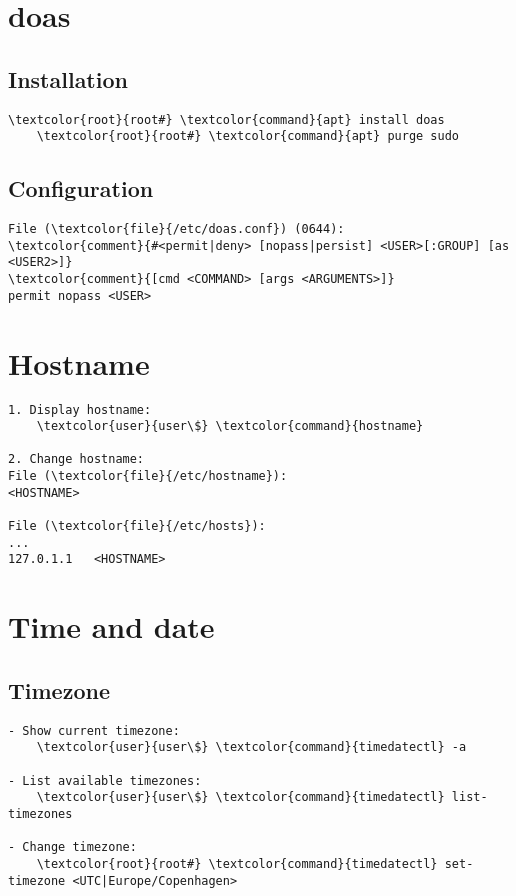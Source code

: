 \documentclass[10pt, a4paper, onecolumn, openany]{book} %
\begin{document}
\section{doas}
\subsection{Installation}
\begin{Verbatim}[commandchars=\\\{\}]
    \textcolor{root}{root#} \textcolor{command}{apt} install doas
    \textcolor{root}{root#} \textcolor{command}{apt} purge sudo
\end{Verbatim}
\subsection{Configuration}
\begin{Verbatim}[commandchars=\\\{\}]
File (\textcolor{file}{/etc/doas.conf}) (0644):
\textcolor{comment}{#<permit|deny> [nopass|persist] <USER>[:GROUP] [as <USER2>]}
\textcolor{comment}{[cmd <COMMAND> [args <ARGUMENTS>]}
permit nopass <USER>
\end{Verbatim}

\section{Hostname}
\begin{Verbatim}[commandchars=\\\{\}]
1. Display hostname:
    \textcolor{user}{user\$} \textcolor{command}{hostname}
    
2. Change hostname:
File (\textcolor{file}{/etc/hostname}):
<HOSTNAME>

File (\textcolor{file}{/etc/hosts}):
...
127.0.1.1   <HOSTNAME>
\end{Verbatim}

\section{Time and date}
\subsection{Timezone}
\begin{Verbatim}[commandchars=\\\{\}]
- Show current timezone:
    \textcolor{user}{user\$} \textcolor{command}{timedatectl} -a

- List available timezones:
    \textcolor{user}{user\$} \textcolor{command}{timedatectl} list-timezones
    
- Change timezone:
    \textcolor{root}{root#} \textcolor{command}{timedatectl} set-timezone <UTC|Europe/Copenhagen>
\end{Verbatim}
\end{document}
